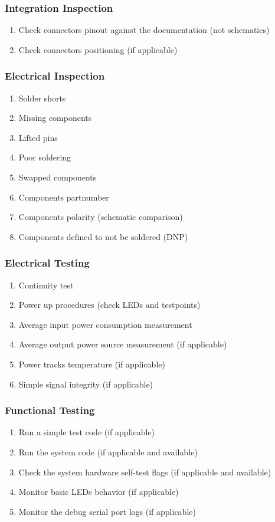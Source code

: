 \subsubsection{Integration Inspection}
\begin{enumerate} \setlength\itemsep{-0.3em}
    \item Check connectors pinout against the documentation (not schematics)
    \item Check connectors positioning (if applicable)
\end{enumerate}

\subsubsection{Electrical Inspection}
\begin{enumerate} \setlength\itemsep{-0.3em}
    \item Solder shorts
    \item Missing components
    \item Lifted pins
    \item Poor soldering
    \item Swapped components
    \item Components partnumber
    \item Components polarity (schematic comparison)
    \item Components defined to not be soldered (DNP)
\end{enumerate}

\subsubsection{Electrical Testing}
\begin{enumerate} \setlength\itemsep{-0.3em}
    \item Continuity test
    \item Power up procedures (check LEDs and testpoints)
    \item Average input power consumption measurement
    \item Average output power source measurement (if applicable) 
    \item Power tracks temperature (if applicable)
    \item Simple signal integrity (if applicable)
\end{enumerate}

\subsubsection{Functional Testing}
\begin{enumerate} \setlength\itemsep{-0.3em}
    \item Run a simple test code (if applicable) 
    \item Run the system code (if applicable and available) 
    \item Check the system hardware self-test flags (if applicable and available) 
    \item Monitor basic LEDs behavior (if applicable) 
    \item Monitor the debug serial port logs (if applicable)
\end{enumerate}

